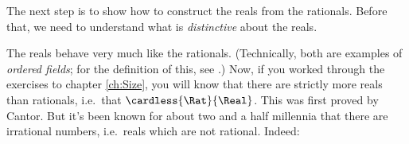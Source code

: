 \documentclass[../../../include/open-logic-section]{subfiles}
\begin{document}
	
The next step is to show how to construct the reals from the rationals. Before that, we need to understand what is \emph{distinctive} about the reals. 

The reals behave very much like the rationals. (Technically, both are examples of \emph{ordered fields}; for the definition of this, see .) Now, if you worked through the exercises to chapter \ref{ch:Size}, you will know that there are strictly more reals than rationals, i.e.\ that $\cardless{\Rat}{\Real}$. This was first proved by Cantor. But it's been known for about two and a half millennia that there are irrational numbers, i.e.\ reals which are not rational. Indeed:%
\end{document}
